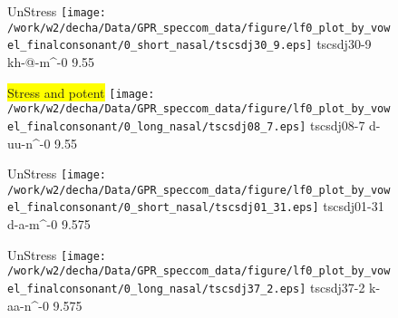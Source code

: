 \documentclass{article}
\begin{document}
\begin{figure}[t]
\begin{minipage}[b]{.24\textwidth}
UnStress
\centering
\texttt{[image: /work/w2/decha/Data/GPR\_speccom\_data/figure/lf0\_plot\_by\_vowel\_finalconsonant/0\_short\_nasal/tscsdj30\_9.eps]}
tscsdj30-9 kh-@-m\textasciicircum-0 9.55
\end{minipage}
\begin{minipage}[b]{.24\textwidth}
\colorbox{yellow}{Stress and potent}
\centering
\texttt{[image: /work/w2/decha/Data/GPR\_speccom\_data/figure/lf0\_plot\_by\_vowel\_finalconsonant/0\_long\_nasal/tscsdj08\_7.eps]}
tscsdj08-7 d-uu-n\textasciicircum-0 9.55
\end{minipage}
\begin{minipage}[b]{.24\textwidth}
UnStress
\centering
\texttt{[image: /work/w2/decha/Data/GPR\_speccom\_data/figure/lf0\_plot\_by\_vowel\_finalconsonant/0\_short\_nasal/tscsdj01\_31.eps]}
tscsdj01-31 d-a-m\textasciicircum-0 9.575
\end{minipage}
\begin{minipage}[b]{.24\textwidth}
UnStress
\centering
\texttt{[image: /work/w2/decha/Data/GPR\_speccom\_data/figure/lf0\_plot\_by\_vowel\_finalconsonant/0\_long\_nasal/tscsdj37\_2.eps]}
tscsdj37-2 k-aa-n\textasciicircum-0 9.575
\end{minipage}
\end{figure}
\end{document}
